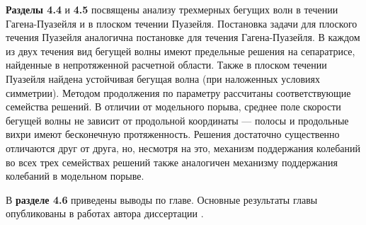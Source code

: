 \textbf{Разделы 4.4} и \textbf{4.5} посвящены анализу трехмерных бегущих волн в течении Гагена-Пуазейля и в плоском течении Пуазейля. Постановка задачи для плоского течения Пуазейля аналогична постановке для течения Гагена-Пуазейля. В каждом из двух течения вид бегущей волны имеют предельные решения на сепаратрисе, найденные в непротяженной расчетной области. Также в плоском течении Пуазейля найдена устойчивая бегущая волна (при наложенных условиях симметрии). Методом продолжения по параметру рассчитаны соответствующие семейства решений. В отличии от модельного порыва, среднее поле скорости бегущей волны не зависит от продольной координаты --- полосы и продольные вихри имеют бесконечную протяженность. Решения достаточно существенно отличаются друг от друга, но, несмотря на это, механизм поддержания колебаний во всех трех семействах решений также аналогичен механизму поддержания колебаний в модельном порыве. 
 
В \textbf{разделе 4.6} приведены выводы по главе. Основные результаты главы опубликованы в работах автора диссертации \cite{Vest18, KMU2016, Lomonosov2018, Lomonosov2017, LomRead2017, LomRead2016, Ob2018}. 


